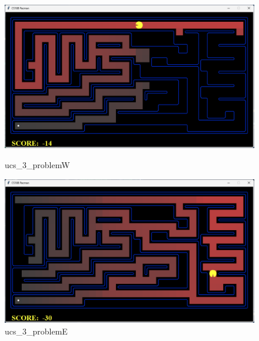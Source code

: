 \begin{figure}[!htbp]
    \centering
    \begin{minipage}[t]{0.3\textwidth}
    \centering
    \includegraphics[width=\textwidth]{pic/W.png}
    \caption{ucs\_3\_problemW}\label{W}
    \end{minipage}
    \begin{minipage}[t]{0.3\textwidth}
    \centering
    \includegraphics[width=\textwidth]{pic/E.png}
    \caption{ucs\_3\_problemE}\label{E}
    \end{minipage}
\end{figure}
